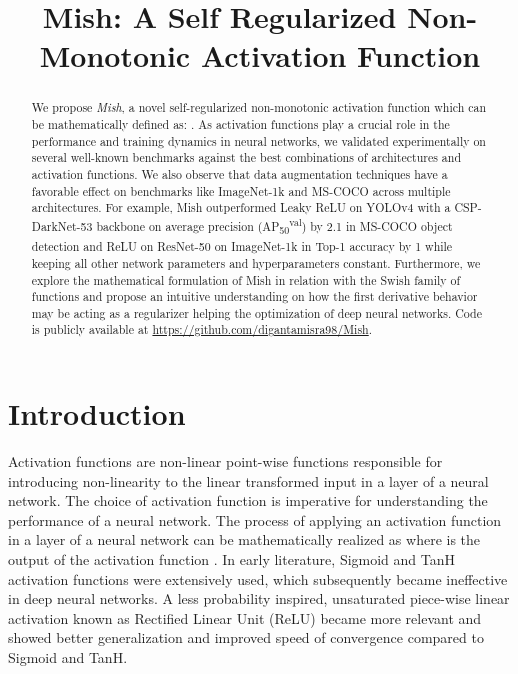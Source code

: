 \documentclass{bmvc2k}
\title{Mish: A Self Regularized Non-Monotonic Activation Function}
\begin{document}
\maketitle

\begin{abstract}
 We propose \textit{Mish}, a novel self-regularized non-monotonic activation function which can be mathematically defined as: . As activation functions play a crucial role in the performance and training dynamics in neural networks, we validated experimentally on several well-known benchmarks against the best combinations of architectures and activation functions. We also observe that data augmentation techniques have a favorable effect on benchmarks like ImageNet-1k and MS-COCO across multiple architectures. For example, Mish outperformed Leaky ReLU on YOLOv4 with a CSP-DarkNet-53 backbone on average precision (AP\textsubscript{50}\textsuperscript{val}) by 2.1 in MS-COCO object detection and ReLU on ResNet-50 on ImageNet-1k in Top-1 accuracy by 1 while keeping all other network parameters and hyperparameters constant. Furthermore, we explore the mathematical formulation of Mish in relation with the Swish family of functions and propose an intuitive understanding on how the first derivative behavior may be acting as a regularizer helping the optimization of deep neural networks. Code is publicly available at \url{https://github.com/digantamisra98/Mish}.
\end{abstract}

\section{Introduction}
\label{sec:intro}
Activation functions are non-linear point-wise functions responsible for introducing non-linearity to the linear transformed input in a layer of a neural network. The choice of activation function is imperative for understanding the performance of a neural network. The process of applying an activation function in a layer of a neural network can be mathematically realized as  where  is the output of the activation function . In early literature, Sigmoid and TanH activation functions were extensively used, which subsequently became ineffective in deep neural networks. A less probability inspired, unsaturated piece-wise linear activation known as Rectified Linear Unit (ReLU) \cite{nair2010rectified,krizhevsky2012imagenet} became more relevant and showed better generalization and improved speed of convergence compared to Sigmoid and TanH. 
\end{document}
